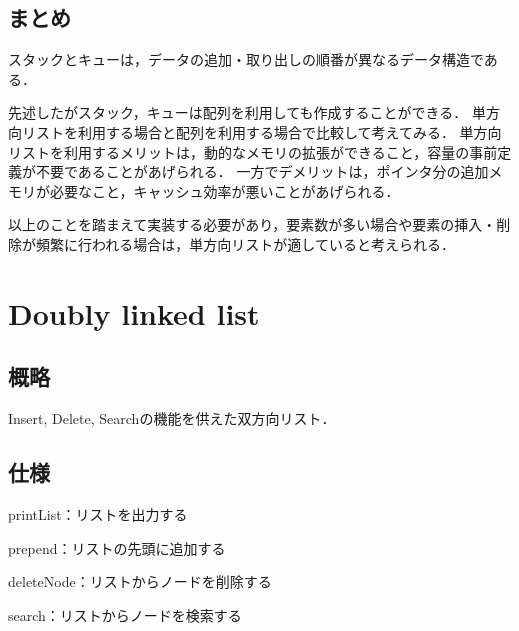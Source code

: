 \documentclass{ltjsarticle}
\begin{document}
\subsection{まとめ}
スタックとキューは，データの追加・取り出しの順番が異なるデータ構造である．

先述したがスタック，キューは配列を利用しても作成することができる．
単方向リストを利用する場合と配列を利用する場合で比較して考えてみる．
単方向リストを利用するメリットは，動的なメモリの拡張ができること，容量の事前定義が不要であることがあげられる．
一方でデメリットは，ポインタ分の追加メモリが必要なこと，キャッシュ効率が悪いことがあげられる．

以上のことを踏まえて実装する必要があり，要素数が多い場合や要素の挿入・削除が頻繁に行われる場合は，単方向リストが適していると考えられる．


\section{Doubly linked list}
\subsection{概略}
Insert, Delete, Searchの機能を供えた双方向リスト．

\subsection{仕様}
\noindent printList：リストを出力する

\noindent prepend：リストの先頭に追加する

\noindent deleteNode：リストからノードを削除する

\noindent search：リストからノードを検索する
\end{document}
